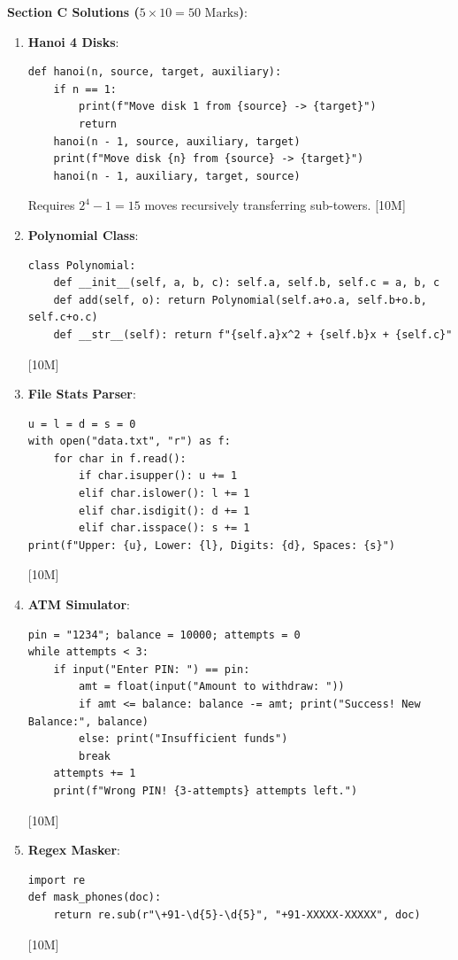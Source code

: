\begin{solutionbox}
\medskip
\noindent\textbf{Section C Solutions ($5 \times 10 = 50\text{ Marks}$)}:
\begin{enumerate}[start=17]
    \item \textbf{Hanoi 4 Disks}:
    \begin{lstlisting}[language=Python3]
def hanoi(n, source, target, auxiliary):
    if n == 1:
        print(f"Move disk 1 from {source} -> {target}")
        return
    hanoi(n - 1, source, auxiliary, target)
    print(f"Move disk {n} from {source} -> {target}")
    hanoi(n - 1, auxiliary, target, source)
    \end{lstlisting}
    Requires $2^4 - 1 = 15$ moves recursively transferring sub-towers. [10M]
    \item \textbf{Polynomial Class}:
    \begin{lstlisting}[language=Python3]
class Polynomial:
    def __init__(self, a, b, c): self.a, self.b, self.c = a, b, c
    def add(self, o): return Polynomial(self.a+o.a, self.b+o.b, self.c+o.c)
    def __str__(self): return f"{self.a}x^2 + {self.b}x + {self.c}"
    \end{lstlisting} [10M]
    \item \textbf{File Stats Parser}:
    \begin{lstlisting}[language=Python3]
u = l = d = s = 0
with open("data.txt", "r") as f:
    for char in f.read():
        if char.isupper(): u += 1
        elif char.islower(): l += 1
        elif char.isdigit(): d += 1
        elif char.isspace(): s += 1
print(f"Upper: {u}, Lower: {l}, Digits: {d}, Spaces: {s}")
    \end{lstlisting} [10M]
    \item \textbf{ATM Simulator}:
    \begin{lstlisting}[language=Python3]
pin = "1234"; balance = 10000; attempts = 0
while attempts < 3:
    if input("Enter PIN: ") == pin:
        amt = float(input("Amount to withdraw: "))
        if amt <= balance: balance -= amt; print("Success! New Balance:", balance)
        else: print("Insufficient funds")
        break
    attempts += 1
    print(f"Wrong PIN! {3-attempts} attempts left.")
    \end{lstlisting} [10M]
    \item \textbf{Regex Masker}:
    \begin{lstlisting}[language=Python3]
import re
def mask_phones(doc):
    return re.sub(r"\+91-\d{5}-\d{5}", "+91-XXXXX-XXXXX", doc)
    \end{lstlisting} [10M]
\end{enumerate}
\end{solutionbox}

